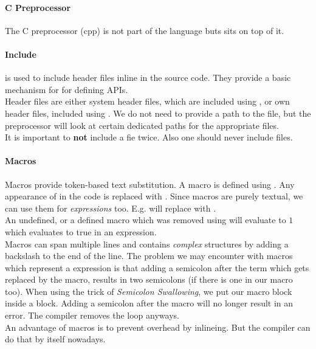 

\paragraph{C Preprocessor}
The C preprocessor (cpp) is not part of the language buts sits on top of it.

\paragraph{Include}
 is used to include header files inline in the source code. They provide a basic mechanism for for defining APIs.\\
Header files are either system header files, which are included using , or own header files, included using . We do not need to provide a path to the file, but the preprocessor will look at certain dedicated paths for the appropriate files.\\
It is important to \textbf{not} include a fie twice. Also one should never include  files.

\paragraph{Macros}
Macros provide token-based text substitution. A macro is defined using . Any appearance of  in the code is replaced with . Since macros are purely textual, we can use them for \textit{expressions} too. E.g.  will replace  with .\\
An undefined, or a defined macro which was removed using  will evaluate to $1$ which evaluates to true in an expression.\\
Macros can span multiple lines and contains \textit{complex} structures by adding a backslash to the end of the line. The problem we may encounter with macros which represent a expression is that adding a semicolon after the term which gets replaced by the macro, results in two semicolons (if there is one in our macro too). When using the trick of \textit{Semicolon Swallowing}, we put our macro block inside a  block. Adding a semicolon after the macro will no longer result in an error. The compiler removes the loop anyways.\\
An advantage of macros is to prevent overhead by inlineing. But the compiler can do that by itself nowadays.

